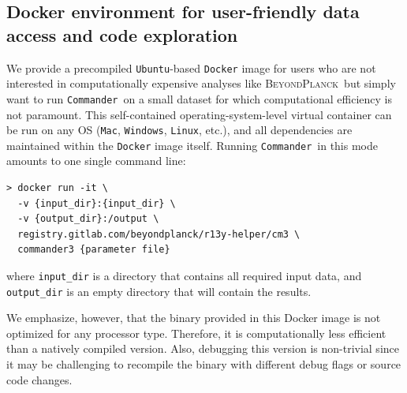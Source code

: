 \documentclass[twocolumn]{aa}
\def\commander{\texttt{Commander}}
\newcommand{\BP}{\textsc{BeyondPlanck}}
\begin{document}
\subsection{Docker environment for user-friendly data access and code exploration}

We provide a precompiled \texttt{Ubuntu}-based \texttt{Docker} image for users who are not interested in computationally expensive analyses like \BP\ but simply want to run \commander\ on a small dataset for which computational efficiency is not paramount. This self-contained operating-system-level virtual container can be run on any OS (\texttt{Mac}, \texttt{Windows}, \texttt{Linux}, etc.), and all dependencies are maintained within the \texttt{Docker} image itself. Running \commander\ in this mode amounts to one single command line:
{\small
\begin{verbatim}
> docker run -it \
  -v {input_dir}:{input_dir} \
  -v {output_dir}:/output \
  registry.gitlab.com/beyondplanck/r13y-helper/cm3 \
  commander3 {parameter file}
\end{verbatim}
}
\noindent where \texttt{input\_dir} is a directory that contains all required
input data, and \texttt{output\_dir} is an empty directory that will
contain the results. 

We emphasize, however, that the binary provided in this Docker image is not optimized for any processor type. Therefore, it is computationally less efficient than a natively compiled version. Also, debugging this version is non-trivial since it may be challenging to recompile the binary with different debug flags or source code changes.




\end{document}

